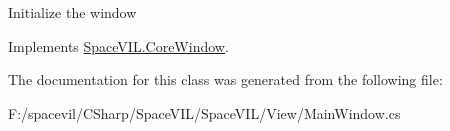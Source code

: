Initialize the window 



Implements \mbox{\hyperlink{class_space_v_i_l_1_1_core_window_aa3cf4ac54d9651b1149584dc81042824}{Space\+V\+I\+L.\+Core\+Window}}.



The documentation for this class was generated from the following file\+:\begin{DoxyCompactItemize}
\item 
F\+:/spacevil/\+C\+Sharp/\+Space\+V\+I\+L/\+Space\+V\+I\+L/\+View/Main\+Window.\+cs\end{DoxyCompactItemize}

